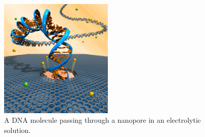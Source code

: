 \begin{figure}
\centering
\includegraphics[width=0.48\textwidth]{plots/dna-nano.png}
\caption{\label{fig:dna-nano}A DNA molecule passing through a nanopore in an
electrolytic solution.}
\end{figure}
